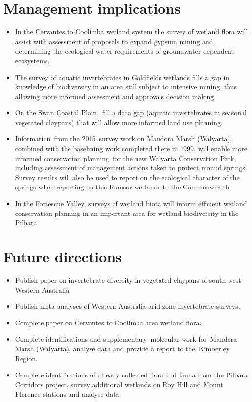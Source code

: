 \documentclass[version=last,
    paper=a4, %
    10pt, %
    usenames,
    dvipsnames,
    oneside, %
    headings=openany, %
    DIV=15 %
]{scrbook}
\begin{document}
\section*{Management implications}
\begin{itemize}
\itemsep1pt\parskip0pt
\item
  In the Cervantes to Coolimba wetland system the survey of wetland
  flora will assist with assessment of proposals to expand gypsum mining
  and determining the ecological water requirements of groundwater
  dependent ecosystems.
\item
  The survey of aquatic invertebrates in Goldfields wetlands fills a gap
  in knowledge of biodiversity in an area still subject to intensive
  mining, thus allowing more informed assessment and approvals decision
  making.
\item
  On the Swan Coastal Plain,~fill a data gap (aquatic invertebrates in
  seasonal vegetated claypans) that will allow more informed land use
  planning.
\item
  Information~from the 2015~survey work on Mandora Marsh (Walyarta),
  combined with the baselining work completed there in 1999, will enable
  more informed conservation planning~for the new Walyarta Conservation
  Park, including assessment of management actions taken to protect
  mound springs. Survey results will also be used to report on the
  ecological character of the springs when reporting on this Ramsar
  wetlands to the Commonwealth.
\item
  In the Fortescue Valley, surveys of wetland biota will inform
  efficient wetland conservation planning in an important area for
  wetland biodiversity in the Pilbara.
\end{itemize}



\section*{Future directions}
\begin{itemize}
\itemsep1pt\parskip0pt
\item
  Publish paper on invertebrate diversity in vegetated claypans of
  south-west Western Australia.
\item
  Publish meta-analyses of Western Australia arid zone invertebrate
  surveys.
\item
  Complete paper on Cervantes to Coolimba area wetland flora.
\item
  Complete identifications and supplementary~molecular work for~Mandora
  Marsh (Walyarta), analyse data and provide a report to the~Kimberley
  Region.
\item
  Complete identifications of already collected flora and fauna from the
  Pilbara Corridors project, survey additional wetlands on Roy Hill and
  Mount Florence stations and analyse data.
\end{itemize}



\end{document}

